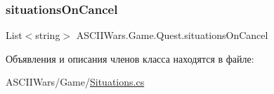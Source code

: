 \subsubsection{\texorpdfstring{situations\+On\+Cancel}{situationsOnCancel}}
{\footnotesize\ttfamily List$<$string$>$ A\+S\+C\+I\+I\+Wars.\+Game.\+Quest.\+situations\+On\+Cancel}



Объявления и описания членов класса находятся в файле\+:\begin{DoxyCompactItemize}
\item 
A\+S\+C\+I\+I\+Wars/\+Game/\hyperlink{_situations_8cs}{Situations.\+cs}\end{DoxyCompactItemize}
